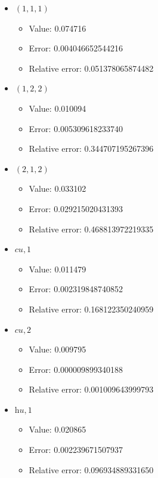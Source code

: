 \documentclass{article}%
\begin{document}
\begin{itemize}%
	\item $(1, 1, 1)$%
	\begin{itemize}%
		\item Value: 0.074716%
		\item Error: 0.004046652544216%
		\item Relative error: 0.051378065874482%
	\end{itemize}%
	\item $(1, 2, 2)$%
	\begin{itemize}%
		\item Value: 0.010094%
		\item Error: 0.005309618233740%
		\item Relative error: 0.344707195267396%
	\end{itemize}%
	\item $(2, 1, 2)$%
	\begin{itemize}%
		\item Value: 0.033102%
		\item Error: 0.029215020431393%
		\item Relative error: 0.468813972219335%
	\end{itemize}%
	\item $\textit{cu},1$%
	\begin{itemize}%
		\item Value: 0.011479%
		\item Error: 0.002319848740852%
		\item Relative error: 0.168122350240959%
	\end{itemize}%
	\item $\textit{cu},2$%
	\begin{itemize}%
		\item Value: 0.009795%
		\item Error: 0.000009899340188%
		\item Relative error: 0.001009643999793%
	\end{itemize}%
	\item $\textit{hu},1$%
	\begin{itemize}%
		\item Value: 0.020865%
		\item Error: 0.002239671507937%
		\item Relative error: 0.096934889331650%
	\end{itemize}%
\end{itemize}%
\end{document}

